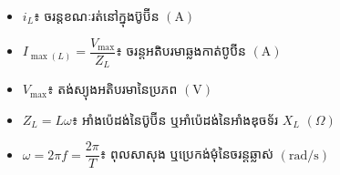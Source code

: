 \vspace{0.2em}
\noindent
\begin{minipage}[t]{0.48\textwidth}
	\begin{itemize}[itemsep=2pt, topsep=1pt, parsep=0pt, leftmargin=1.5em]
		\item $i_L$៖ ចរន្តខណៈរត់នៅក្នុងប៊ូប៊ីន $(\mathrm{A})$
		\item $I_{\max(L)} = \dfrac{V_{\max}}{Z_L}$៖ ចរន្តអតិបរមាឆ្លងកាត់ប៊ូប៊ីន $(\mathrm{A})$
		\item $V_{\max}$៖ តង់ស្យុងអតិបរមានៃប្រភព $(\mathrm{V})$
	\end{itemize}
\end{minipage}%
\hfill
\begin{minipage}[t]{0.48\textwidth}
	\begin{itemize}[itemsep=2pt, topsep=1pt, parsep=0pt, leftmargin=1.5em]
		\item $Z_L = L\omega$៖ អាំងប៉េដង់នៃប៊ូប៊ីន ឬអាំប៉េដង់នៃអាំងឌុចទ័រ $X_L$ $(\Omega)$
		\item $\omega = 2\pi f = \dfrac{2\pi}{T}$៖ ពុលសាសុង ឬប្រេកង់មុំនៃចរន្តឆ្លាស់ $(\mathrm{rad/s})$
	\end{itemize}
\end{minipage}

\vspace{0.4em}

